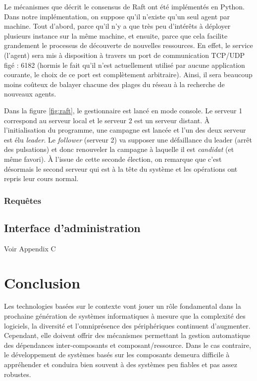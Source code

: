 Le mécanismes que décrit le consensus de Raft ont été implémentés en Python.
Dans notre implémentation, on suppose qu'il n'existe qu'un seul agent par
machine. Tout d'abord, parce qu'il n'y a que très peu d'intérêts à déployer
plusieurs instance sur la même machine, et ensuite, parce que cela facilite
grandement le processus de découverte de nouvelles ressources. En effet, le
service (l'agent) sera mis à disposition à travers un port de communication
TCP/UDP figé : 6182 (hormis le fait qu'il n'est actuellement utilisé par aucune
application courante, le choix de ce port est complètement arbitraire). Ainsi,
il sera beaucoup moins coûteux de balayer chacune des plages du réseau à la
recherche de nouveaux agents.

Dans la figure \ref{fig:raft}, le gestionnaire est lancé en mode console. Le
serveur 1 correspond au serveur local et le serveur 2 est un serveur distant. À
l'initialisation du programme, une campagne est lancée et l'un des deux serveur
est élu \emph{leader}. Le \emph{follower} (serveur 2) va supposer une
défaillance du leader (arrêt des pulsations) et donc renouveler la campagne à
laquelle il est \emph{candidat} (et même favori). À l'issue de cette seconde
élection, on remarque que c'est désormais le second serveur qui est à la tête du
système et les opérations ont repris leur cours normal.

\subsubsection{Requêtes}

\subsection{Interface d'administration}

Voir Appendix C

\section{Conclusion}

Les technologies basées sur le contexte vont jouer un rôle fondamental dans la
prochaine génération de systèmes informatiques à mesure que la complexité des
logiciels, la diversité et l'omniprésence des périphériques continuent
d'augmenter. Cependant, elle doivent offrir des mécanismes permettant la
gestion automatique des dépendances inter-composants et composant/ressource.
Dans le cas contraire, le développement de systèmes basés sur les composants
demeura difficile à appréhender et conduira bien souvent à des systèmes peu
fiables et pas assez robustes.

